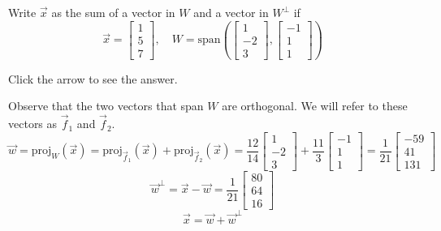 \documentclass{ximera}
\begin{document}
\begin{problem}\label{OrthoDecomp1} Write $\vec{x}$ as the sum of a vector in $W$ and a vector in $W^\perp$ if
$$\vec{x} = \begin{bmatrix}1\\ 5\\ 7\end{bmatrix},\quad W = \mbox{span}\left(\begin{bmatrix}1\\ -2\\ 3\end{bmatrix}, \begin{bmatrix}-1\\ 1\\ 1\end{bmatrix}\right)$$

Click the arrow to see the answer.
\begin{expandable}{}{}
Observe that the two vectors that span $W$ are orthogonal.  We will refer to these vectors as $\vec{f}_1$ and $\vec{f}_2$.
$$\vec{w}=\text{proj}_W(\vec{x})=\text{proj}_{\vec{f}_1}(\vec{x})+\text{proj}_{\vec{f}_2}(\vec{x})=\frac{12}{14}\begin{bmatrix}1\\-2\\3\end{bmatrix}+\frac{11}{3}\begin{bmatrix}-1\\1\\1\end{bmatrix}=\frac{1}{21}\begin{bmatrix}-59\\41\\131\end{bmatrix}$$
$$\vec{w}^{\perp}=\vec{x}-\vec{w}=\frac{1}{21}\begin{bmatrix}80\\64\\16\end{bmatrix}$$
$$\vec{x}=\vec{w}+\vec{w}^{\perp}$$
\end{expandable}
\end{problem}
\end{document}
